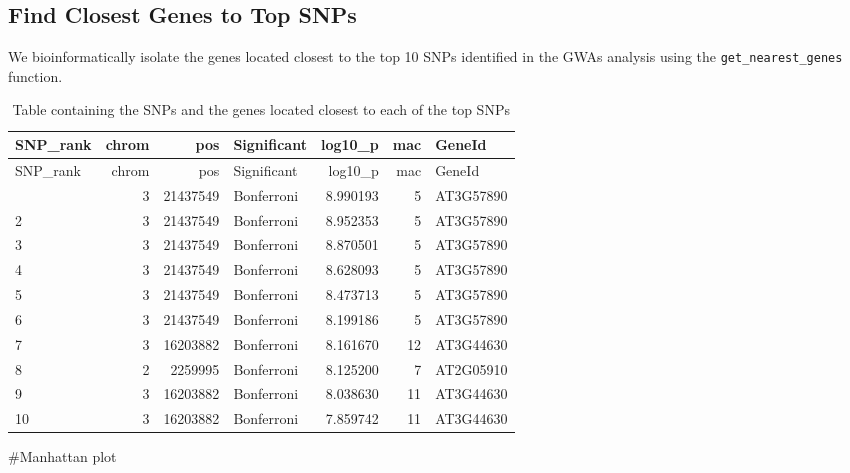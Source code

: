 \documentclass[
  11pt,
]{article}
\begin{document}
\subsection{Find Closest Genes to Top
SNPs}\label{find-closest-genes-to-top-snps}

We bioinformatically isolate the genes located closest to the top 10
SNPs identified in the GWAs analysis using the
\texttt{get\_nearest\_genes} function.

\begin{longtable}[]{@{}lrrlrrl@{}}
\caption{Table containing the SNPs and the genes located closest to each
of the top SNPs}\tabularnewline
\toprule\noalign{}
SNP\_rank & chrom & pos & Significant & log10\_p & mac & GeneId \\
\midrule\noalign{}
\endfirsthead
\toprule\noalign{}
SNP\_rank & chrom & pos & Significant & log10\_p & mac & GeneId \\
\midrule\noalign{}
\endhead
\bottomrule\noalign{}
\endlastfoot
1 & 3 & 21437549 & Bonferroni & 8.990193 & 5 & AT3G57890 \\
2 & 3 & 21437549 & Bonferroni & 8.952353 & 5 & AT3G57890 \\
3 & 3 & 21437549 & Bonferroni & 8.870501 & 5 & AT3G57890 \\
4 & 3 & 21437549 & Bonferroni & 8.628093 & 5 & AT3G57890 \\
5 & 3 & 21437549 & Bonferroni & 8.473713 & 5 & AT3G57890 \\
6 & 3 & 21437549 & Bonferroni & 8.199186 & 5 & AT3G57890 \\
7 & 3 & 16203882 & Bonferroni & 8.161670 & 12 & AT3G44630 \\
8 & 2 & 2259995 & Bonferroni & 8.125200 & 7 & AT2G05910 \\
9 & 3 & 16203882 & Bonferroni & 8.038630 & 11 & AT3G44630 \\
10 & 3 & 16203882 & Bonferroni & 7.859742 & 11 & AT3G44630 \\
\end{longtable}

\#Manhattan plot
\end{document}
